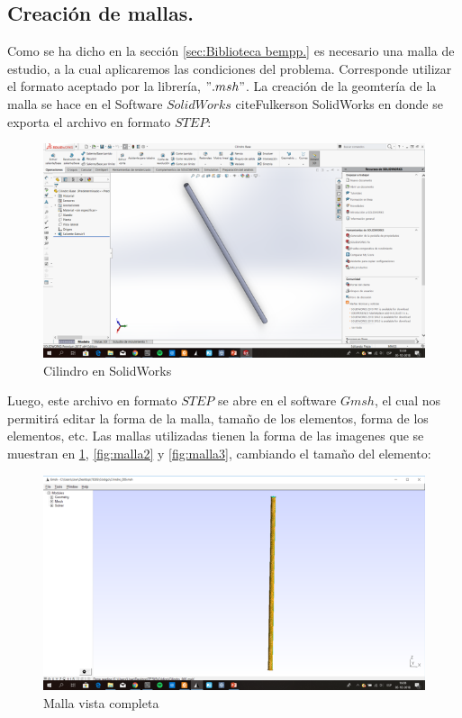 \documentclass[11pt]{article}
\begin{document}
\subsection{Creación de mallas.}\label{sec:Creacion de mallas.}
Como se ha dicho en la sección \ref{sec:Biblioteca bempp.} es necesario una malla de estudio, a la cual aplicaremos las condiciones del problema. Corresponde utilizar el formato aceptado por la librería, $".msh"$. La creación de la geomtería de la malla se hace en el Software $SolidWorks$ cite{Fulkerson SolidWorks} en  donde se exporta el archivo en formato $STEP$:
\begin{figure}[H]
\centering
\includegraphics[scale=0.8]{Imagenes/Cilindro STEP.png}
\caption{Cilindro en SolidWorks}
\end{figure}
Luego, este archivo en formato $STEP$ se abre en el software $Gmsh$, el cual nos permitirá editar la forma de la malla, tamaño de los elementos, forma de los elementos, etc. Las mallas utilizadas tienen la forma de las imagenes que se muestran en \ref{fig:malla1}, \ref{fig:malla2} y \ref{fig:malla3}, cambiando el tamaño del elemento:
\begin{figure}[H]
\centering
\includegraphics[scale=0.8]{Imagenes/malla1.png}
\caption{Malla vista completa}\label{fig:malla1}
\end{figure}
\end{document}
